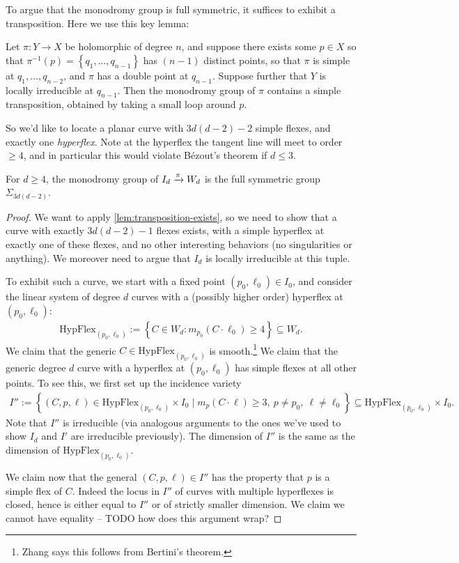 \documentclass[11pt]{amsart}
\providecommand{\HypFlex}{\mathrm{HypFlex}}
\begin{document}
To argue that the monodromy group is full symmetric, it suffices to exhibit a transposition. Here we use this key lemma:

\begin{lemma} 
\label{lem:transposition-exists}
Let $\pi \colon Y \to X$ be holomorphic of degree $n$, and suppose there exists some $p\in X$ so that $\pi^{-1}(p) = \left\{ q_1, \ldots, q_{n-1} \right\}$ has $(n-1)$ distinct points, so that $\pi$ is simple at $q_1, \ldots, q_{n-2}$, and $\pi$ has a double point at $q_{n-1}$. Suppose further that $Y$ is locally irreducible at $q_{n-1}$. Then the monodromy group of $\pi$ contains a simple transposition, obtained by taking a small loop around $p$.
\end{lemma}

So we'd like to locate a planar curve with $3d(d-2) - 2$ simple flexes, and exactly one \textit{hyperflex}. Note at the hyperflex the tangent line will meet to order $\ge 4$, and in particular this would violate B\'{e}zout's theorem if $d \le 3$.

\begin{theorem} For $d\ge 4$, the monodromy group of $I_d \xrightarrow{\pi} W_d$ is the full symmetric group $\Sigma_{3d(d-2)}$.
\end{theorem}
\begin{proof} We want to apply \autoref{lem:transposition-exists}, so we need to show that a curve with exactly $3d(d-2)-1$ flexes exists, with a simple hyperflex at exactly one of these flexes, and no other interesting behaviors (no singularities or anything). We moreover need to argue that $I_d$ is locally irreducible at this tuple.

To exhibit such a curve, we start with a fixed point $(p_0,\ell_0) \in I_0$, and consider the linear system of degree $d$ curves with a (possibly higher order) hyperflex at $(p_0,\ell_0)$:
\begin{align*}
    \HypFlex_{(p_0,\ell_0)} := \left\{ C\in W_d \colon m_{p_0}(C\cdot \ell_0) \ge 4 \right\} \subseteq W_d.
\end{align*}
We claim that the generic $C \in \HypFlex_{(p_0,\ell_0)}$ is smooth.\footnote{Zhang says this follows from Bertini's theorem.} We claim that the generic degree $d$ curve with a hyperflex at $(p_0,\ell_0)$ has simple flexes at all other points. To see this, we first set up the incidence variety
\begin{align*}
    I'' := \left\{ (C,p,\ell) \in \HypFlex_{(p_0,\ell_0)} \times I_0 \mid m_p(C\cdot \ell)\ge 3,\ p\ne p_0,\ \ell\ne \ell_0  \right\} \subseteq \HypFlex_{(p_0,\ell_0)} \times I_0.
\end{align*}
Note that $I''$ is irreducible (via analogous arguments to the ones we've used to show $I_d$ and $I'$ are irreducible previously). The dimension of $I''$ is the same as the dimension of $\HypFlex_{(p_0,\ell_0)}$.

We claim now that the general $(C,p,\ell) \in I''$ has the property that $p$ is a simple flex of $C$. Indeed the locus in $I''$ of curves with multiple hyperflexes is closed, hence is either equal to $I''$ or of strictly smaller dimension. We claim we cannot have equality -- TODO how does this argument wrap?
\end{proof}
\end{document}
